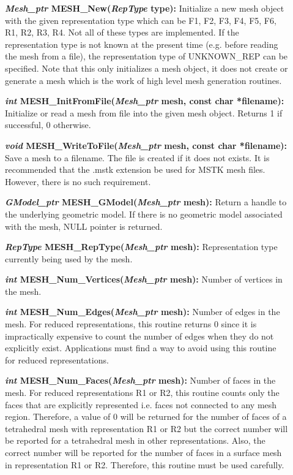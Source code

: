 \documentclass[12pt]{article}
\begin{document}
 
\begin{description}
\item[]\textbf{\textit{Mesh\_ptr} MESH\_New(\textit{RepType} type):}
Initialize a new mesh object with the given representation type which
can be F1, F2, F3, F4, F5, F6, R1, R2, R3, R4. Not all of these types
are implemented. If the representation type is not known at the
present time (e.g. before reading the mesh from a file), the
representation type of UNKNOWN\_REP can be specified.  Note that this
only initializes a mesh object, it does not create or generate a mesh
which is the work of high level mesh generation routines.

\item[]\textbf{\textit{int} MESH\_InitFromFile(\textit{Mesh\_ptr} mesh,
const char *filename):} Initialize or read a mesh from file into the
given mesh object. Returns 1 if successful, 0 otherwise.

\item[]\textbf{\textit{void} MESH\_WriteToFile(\textit{Mesh\_ptr} mesh,
const char *filename):} Save a mesh to a filename. The file is created
if it does not exists. It is recommended that the .mstk extension be
used for MSTK mesh files.  However, there is no such requirement.

\item[]\textbf{\textit{GModel\_ptr} MESH\_GModel(\textit{Mesh\_ptr} mesh):}
Return a handle to the underlying geometric model. If there is no
geometric model associated with the mesh, NULL pointer is returned.

\item[]\textbf{\textit{RepType} MESH\_RepType(\textit{Mesh\_ptr} mesh):}
Representation type currently being used by the mesh.

\item[]\textbf{\textit{int} MESH\_Num\_Vertices(\textit{Mesh\_ptr} mesh):}
Number of vertices in the mesh.

\item[]\textbf{\textit{int} MESH\_Num\_Edges(\textit{Mesh\_ptr} mesh):}
Number of edges in the mesh. For reduced representations, this routine
returns 0 since it is impractically expensive to count the number of
edges when they do not explicitly exist. Applications must find a way
to avoid using this routine for reduced representations.

\item[]\textbf{\textit{int} MESH\_Num\_Faces(\textit{Mesh\_ptr} mesh):}
Number of faces in the mesh. For reduced representations R1 or R2,
this routine counts only the faces that are explicitly represented
i.e. faces not connected to any mesh region. Therefore, a value of 0
will be returned for the number of faces of a tetrahedral mesh with
representation R1 or R2 but the correct number will be reported for a
tetrahedral mesh in other representations. Also, the correct number
will be reported for the number of faces in a surface mesh in
representation R1 or R2.  Therefore, this routine must be used
carefully.



\end{description}
\end{document}
